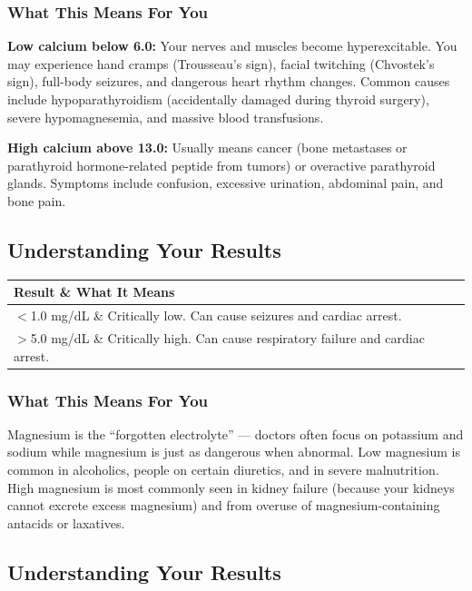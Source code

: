 \subsubsection{What This Means For You}

\textbf{Low calcium below 6.0:} Your nerves and muscles become hyperexcitable. You may experience hand cramps (Trousseau's sign), facial twitching (Chvostek's sign), full-body seizures, and dangerous heart rhythm changes. Common causes include hypoparathyroidism (accidentally damaged during thyroid surgery), severe hypomagnesemia, and massive blood transfusions.

\textbf{High calcium above 13.0:} Usually means cancer (bone metastases or parathyroid hormone-related peptide from tumors) or overactive parathyroid glands. Symptoms include confusion, excessive urination, abdominal pain, and bone pain.

\subsection{Understanding Your Results}

\begin{longtable}{@{}ll@{}}
\toprule
\textbf{Result} \& \textbf{What It Means} \\
\midrule
$<$1.0 mg/dL \& Critically low. Can cause seizures and cardiac arrest. \\
$>$5.0 mg/dL \& Critically high. Can cause respiratory failure and cardiac arrest. \\
\bottomrule
\end{longtable}

\subsubsection{What This Means For You}

Magnesium is the ``forgotten electrolyte'' --- doctors often focus on potassium and sodium while magnesium is just as dangerous when abnormal. Low magnesium is common in alcoholics, people on certain diuretics, and in severe malnutrition. High magnesium is most commonly seen in kidney failure (because your kidneys cannot excrete excess magnesium) and from overuse of magnesium-containing antacids or laxatives.

\subsection{Understanding Your Results}

